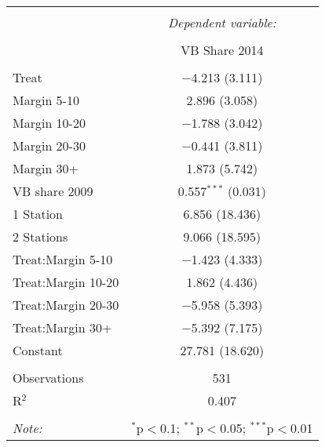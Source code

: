 
\begin{table}[!htbp] \centering 
  \caption{} 
  \label{} 
\begin{tabular}{@{\extracolsep{5pt}}lc} 
\\[-1.8ex]\hline 
\hline \\[-1.8ex] 
 & \multicolumn{1}{c}{\textit{Dependent variable:}} \\ 
\cline{2-2} 
\\[-1.8ex] & VB Share 2014 \\ 
\hline \\[-1.8ex] 
 Treat & $-$4.213 (3.111) \\ 
  Margin 5-10 & 2.896 (3.058) \\ 
  Margin 10-20 & $-$1.788 (3.042) \\ 
  Margin 20-30 & $-$0.441 (3.811) \\ 
  Margin 30+ & 1.873 (5.742) \\ 
  VB share 2009 & 0.557$^{***}$ (0.031) \\ 
  1 Station & 6.856 (18.436) \\ 
  2 Stations & 9.066 (18.595) \\ 
  Treat:Margin 5-10 & $-$1.423 (4.333) \\ 
  Treat:Margin 10-20 & 1.862 (4.436) \\ 
  Treat:Margin 20-30 & $-$5.958 (5.393) \\ 
  Treat:Margin 30+ & $-$5.392 (7.175) \\ 
  Constant & 27.781 (18.620) \\ 
 \hline \\[-1.8ex] 
Observations & 531 \\ 
R$^{2}$ & 0.407 \\ 
\hline 
\hline \\[-1.8ex] 
\textit{Note:}  & \multicolumn{1}{r}{$^{*}$p$<$0.1; $^{**}$p$<$0.05; $^{***}$p$<$0.01} \\ 
\end{tabular} 
\end{table} 
